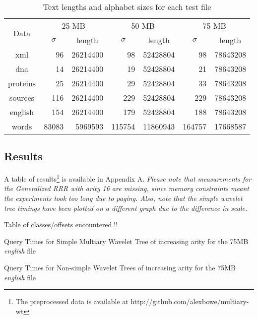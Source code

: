 \begin{center}
\begin{table}[h]
\begin{tabular}{crrrrrr}
\toprule
\multirow{2}{*}{Data} & \multicolumn{2}{c}{25 MB} & \multicolumn{2}{c}{50 MB} &  
	\multicolumn{2}{c}{75 MB}\\
		  \cmidrule(r){2-7}
	      &\multicolumn{1}{c}{$\sigma$}& \multicolumn{1}{c}{length}
		  &\multicolumn{1}{c}{$\sigma$}&\multicolumn{1}{c}{length}
		  &\multicolumn{1}{c}{$\sigma$}&\multicolumn{1}{c}{length}\\
\midrule
xml 	  & 96	   & 26214400 & 98 	   & 52428804 & 98 	   & 78643208 \\
dna 	  & 14     & 26214400 & 19 	   & 52428804 & 21     & 78643208 \\
proteins  & 25     & 26214400 & 29     & 52428804 & 33     & 78643208 \\
sources   & 116    & 26214400 & 229    & 52428804 & 229    & 78643208 \\
english   & 154    & 26214400 & 179    & 52428804 & 188    & 78643208 \\
words     & 83083  & 5969593  & 115754 & 11860943 & 164757 & 17668587 \\
\bottomrule
\end{tabular}
\caption{Text lengths and alphabet sizes for each test file}
\label{tab:files}
\end{table}
\end{center}

\newpage
\subsection{Results}
A table of results\footnote{The preprocessed data is available at
http://github.com/alexbowe/multiary-wt} is available in Appendix A. \emph{Please 
note that 
measurements for the Generalized RRR with arity 16 are missing, since memory 
constraints meant the experiments took too long due to paging. Also, note that
the simple wavelet tree timings have been plotted on a different graph due to
the difference in scale.}

Table of classes/offsets encountered.!!

			{Query Times for Simple Multiary Wavelet Tree of increasing arity
			for the 75MB \emph{english} file}
			
			{Query Times for Non-simple Wavelet Trees of increasing arity
			for the 75MB \emph{english} file}
			
